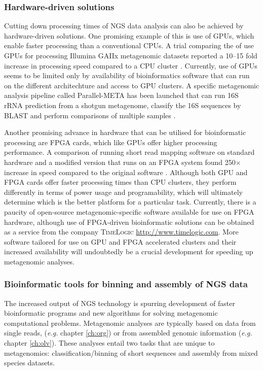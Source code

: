\subsubsection{Hardware-driven solutions}
Cutting down processing times of \ac{NGS} data analysis can also be achieved by hardware-driven solutions.
One promising example of this is use of \acp{GPU}, which enable faster processing than a conventional \acp{CPU}.
A trial comparing the of use \acp{GPU} for processing Illumina GAIIx metagenomic datasets reported a 10--15 fold increase in processing speed compared to a \ac{CPU} cluster \cite{Su2012}.
Currently, use of \acp{GPU} seems to be limited only by availability of bioinformatics software that can run on the different architechture and access to \ac{GPU} clusters.
A specific metagenomic analysis pipeline called Parallel-META has been launched that can run 16S \acs{rRNA} prediction from a shotgun metagenome, classify the 16S sequences by \acs{BLAST} and perform comparisons of multiple samples \cite{Su2012}.

Another promising advance in hardware that can be utilised for bioinformatic processing are \ac{FPGA} cards, which like \acp{GPU} offer higher processing performance.
A comparison of running short read mapping software on standard hardware and a modified version that runs on an \ac{FPGA} system found 250$\times$ increase in speed compared to the original software \cite{Olson2012}.
Although both \ac{GPU} and \ac{FPGA} cards offer faster processing times than \ac{CPU} clusters, they perform differently in terms of power usage and programability, which will ultimately determine which is the better platform for a particular task.
Currently, there is a paucity of open-source metagenomic-specific software available for use on \ac{FPGA} hardware, although use of \ac{FPGA}-driven bioinformatic solutions can be obtained as a service from the company \textsc{TimeLogic} 
\url{http://www.timelogic.com}.
More software tailored for use on \ac{GPU} and \ac{FPGA} accelerated clusters and their increased availability will undoubtedly be a crucial development for speeding up metagenomic analyses.

\subsubsection{Bioinformatic tools for binning and assembly of \acs{NGS} data}
The increased output of \ac{NGS} technology is spurring development of faster bioinformatic programs and new algorithms for solving metagenomic computational problems.
Metagenomic analyses are typically based on data from single reads, (\emph{e.g.} chapter \ref{ch:org}) or from assembled genomic information (\emph{e.g.} chapter \ref{ch:olv}).
These analyses entail two tasks that are unique to metagenomics: classification/binning of short sequences and assembly from mixed species datasets. 


